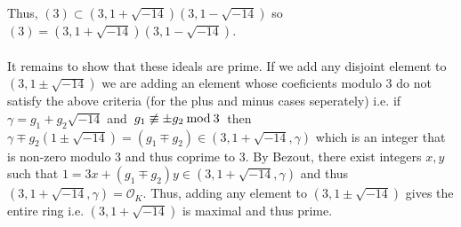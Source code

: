 \documentclass[12pt]{extarticle}
\newcommand{\nmod}[3]{\: #1 \centernot \equiv #2 \: \mathrm{mod} \: #3 \:}
\newcommand{\ints}[1]{\mathcal{O}_{#1}}
\begin{document}
\begin{enumerate}
\begin{enumerate}
Thus, $(3) \subset (3, 1 + \sqrt{-14}) (3, 1 - \sqrt{-14})$ so $(3) = (3, 1 + \sqrt{-14}) (3, 1 - \sqrt{-14})$. \\ \\
It remains to show that these ideals are prime. If we add any disjoint element to $(3, 1 \pm \sqrt{-14})$ we are adding an element whose coeficients modulo $3$ do not satisfy the above criteria (for the plus and minus cases seperately) i.e. if $\gamma = g_1 + g_2 \sqrt{-14}$ and $\nmod{g_1}{\pm g_2}{3}$ then $\gamma \mp g_2 (1 \pm \sqrt{-14}) = (g_1 \mp g_2) \in (3, 1 + \sqrt{-14}, \gamma)$ which is an integer that is non-zero modulo $3$ and thus coprime to $3$. By Bezout, there exist integers $x,y$  such that $1 = 3 x + (g_1 \mp g_2) y \in (3, 1 + \sqrt{-14}, \gamma)$ and thus $(3, 1 + \sqrt{-14}, \gamma) = \ints{K}$. Thus, adding any element to $(3, 1 \pm \sqrt{-14})$ gives the entire ring i.e. $(3, 1 + \sqrt{-14})$ is maximal and thus prime.
\end{enumerate}


\end{enumerate}
\end{document}
